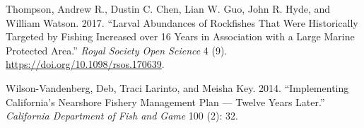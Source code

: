 \documentclass[11pt,
  english,
  letterpaper,
]{article}
\newlength{\cslhangindent}
\newenvironment{CSLReferences}[2] %
 {%
  \setlength{\parindent}{0pt}
  \ifodd #1 \everypar{\setlength{\hangindent}{\cslhangindent}}\ignorespaces\fi
  \ifnum #2 > 0
  \setlength{\parskip}{#2\baselineskip}
  \fi
 }%
 {}
\begin{document}
\begin{CSLReferences}{1}{0}
\leavevmode{}%
Thompson, Andrew R., Dustin C. Chen, Lian W. Guo, John R. Hyde, and William Watson. 2017. {``Larval Abundances of Rockfishes That Were Historically Targeted by Fishing Increased over 16 Years in Association with a Large Marine Protected Area.''} \emph{Royal Society Open Science} 4 (9). \url{https://doi.org/10.1098/rsos.170639}.

\leavevmode{}%
Wilson-Vandenberg, Deb, Traci Larinto, and Meisha Key. 2014. {``Implementing {California}'s {Nearshore} {Fishery} {Management} {Plan} --- Twelve Years Later.''} \emph{California Department of Fish and Game} 100 (2): 32.

\end{CSLReferences}
\end{document}
